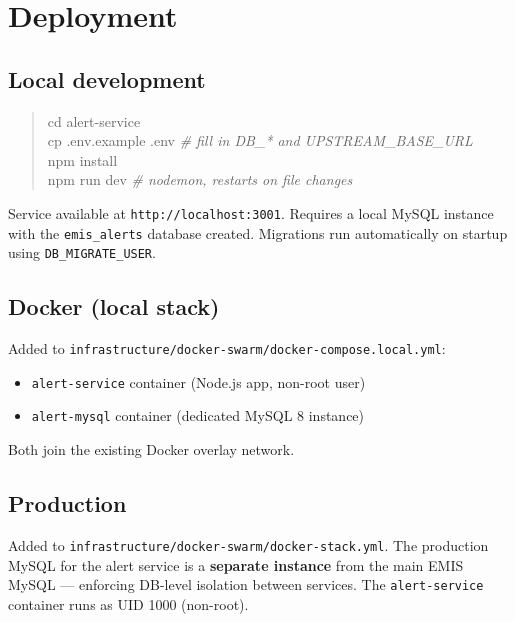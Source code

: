 \documentclass[11pt]{article}
\begin{document}
\section{Deployment}

\subsection{Local development}

\begin{quote}
\small\ttfamily
cd alert-service \\
cp .env.example .env \quad\textit{\# fill in DB\_* and UPSTREAM\_BASE\_URL} \\
npm install \\
npm run dev \quad\quad\quad\quad\textit{\# nodemon, restarts on file changes}
\end{quote}

Service available at \texttt{http://localhost:3001}. Requires a local MySQL instance with
the \texttt{emis\_alerts} database created. Migrations run automatically on startup using
\texttt{DB\_MIGRATE\_USER}.

\subsection{Docker (local stack)}

Added to \texttt{infrastructure/docker-swarm/docker-compose.local.yml}:
\begin{itemize}
  \item \texttt{alert-service} container (Node.js app, non-root user)
  \item \texttt{alert-mysql} container (dedicated MySQL 8 instance)
\end{itemize}
Both join the existing Docker overlay network.

\subsection{Production}

Added to \texttt{infrastructure/docker-swarm/docker-stack.yml}. The production MySQL for
the alert service is a \textbf{separate instance} from the main EMIS MySQL --- enforcing
DB-level isolation between services. The \texttt{alert-service} container runs as UID 1000
(non-root).
\end{document}

